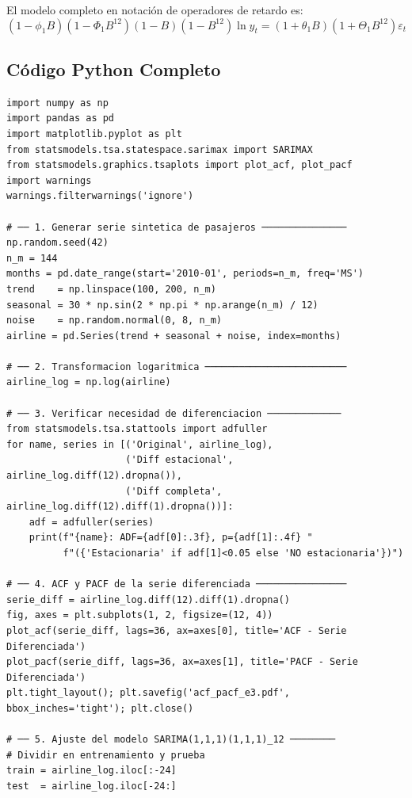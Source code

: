 \documentclass[12pt, a4paper]{article}
\begin{document}
El modelo completo en notación de operadores de retardo es:
\begin{equation}
  (1-\phi_1 B)(1-\Phi_1 B^{12})(1-B)(1-B^{12})\ln y_t
  = (1+\theta_1 B)(1+\Theta_1 B^{12})\varepsilon_t
\end{equation}

\subsection{Código Python Completo}

\begin{lstlisting}[caption={Ejemplo 3: SARIMA(1,1,1)(1,1,1)$_{12}$},
                   label={lst:e3}]
import numpy as np
import pandas as pd
import matplotlib.pyplot as plt
from statsmodels.tsa.statespace.sarimax import SARIMAX
from statsmodels.graphics.tsaplots import plot_acf, plot_pacf
import warnings
warnings.filterwarnings('ignore')

# ── 1. Generar serie sintetica de pasajeros ───────────────
np.random.seed(42)
n_m = 144
months = pd.date_range(start='2010-01', periods=n_m, freq='MS')
trend    = np.linspace(100, 200, n_m)
seasonal = 30 * np.sin(2 * np.pi * np.arange(n_m) / 12)
noise    = np.random.normal(0, 8, n_m)
airline = pd.Series(trend + seasonal + noise, index=months)

# ── 2. Transformacion logaritmica ─────────────────────────
airline_log = np.log(airline)

# ── 3. Verificar necesidad de diferenciacion ─────────────
from statsmodels.tsa.stattools import adfuller
for name, series in [('Original', airline_log),
                     ('Diff estacional', airline_log.diff(12).dropna()),
                     ('Diff completa',   airline_log.diff(12).diff(1).dropna())]:
    adf = adfuller(series)
    print(f"{name}: ADF={adf[0]:.3f}, p={adf[1]:.4f} "
          f"({'Estacionaria' if adf[1]<0.05 else 'NO estacionaria'})")

# ── 4. ACF y PACF de la serie diferenciada ────────────────
serie_diff = airline_log.diff(12).diff(1).dropna()
fig, axes = plt.subplots(1, 2, figsize=(12, 4))
plot_acf(serie_diff, lags=36, ax=axes[0], title='ACF - Serie Diferenciada')
plot_pacf(serie_diff, lags=36, ax=axes[1], title='PACF - Serie Diferenciada')
plt.tight_layout(); plt.savefig('acf_pacf_e3.pdf', bbox_inches='tight'); plt.close()

# ── 5. Ajuste del modelo SARIMA(1,1,1)(1,1,1)_12 ────────
# Dividir en entrenamiento y prueba
train = airline_log.iloc[:-24]
test  = airline_log.iloc[-24:]


\end{lstlisting}
\end{document}
